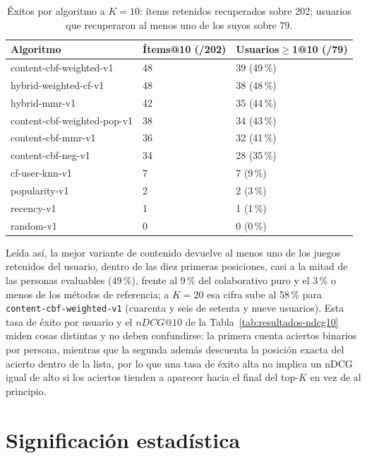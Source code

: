 \begin{table}[H]
\centering
\caption{Éxitos por algoritmo a \(K=10\): ítems retenidos recuperados sobre 202; usuarios
que recuperaron al menos uno de los suyos sobre 79.}\label{tab:exito-usuarios}
\small
\begin{tabularx}{\textwidth}{@{}>{\ttfamily\raggedright\arraybackslash}X C{0.22\textwidth} C{0.25\textwidth}@{}}
\textnormal{Algoritmo} & \textnormal{Ítems@10 (/202)} & \textnormal{Usuarios\(\geq\)1@10 (/79)} \\
\hline
content-cbf-weighted-v1 & 48 & 39 (49\,\%) \\
hybrid-weighted-cf-v1 & 48 & 38 (48\,\%) \\
hybrid-mmr-v1 & 42 & 35 (44\,\%) \\
content-cbf-weighted-pop-v1 & 38 & 34 (43\,\%) \\
content-cbf-mmr-v1 & 36 & 32 (41\,\%) \\
content-cbf-neg-v1 & 34 & 28 (35\,\%) \\
cf-user-knn-v1 & 7 & 7 (9\,\%) \\
popularity-v1 & 2 & 2 (3\,\%) \\
recency-v1 & 1 & 1 (1\,\%) \\
random-v1 & 0 & 0 (0\,\%) \\
\end{tabularx}
\end{table}

Leída así, la mejor variante de contenido devuelve al menos uno de los juegos retenidos del
usuario, dentro de las diez primeras posiciones, casi a la mitad de las personas evaluables
(49\,\%), frente al 9\,\% del colaborativo puro y el 3\,\% o menos de los métodos de referencia; a
\(K=20\) esa cifra sube al 58\,\% para \texttt{content-cbf-weighted-v1} (cuarenta y seis de
setenta y nueve usuarios). Esta tasa de éxito por usuario y el \(nDCG@10\) de la
Tabla~\ref{tab:resultados-ndcg10} miden cosas distintas y no deben confundirse: la primera
cuenta aciertos binarios por persona, mientras que la segunda además descuenta la posición
exacta del acierto dentro de la lista, por lo que una tasa de éxito alta no implica un nDCG
igual de alto si los aciertos tienden a aparecer hacia el final del top-\(K\) en vez de al
principio.

\section{Significación estadística}\label{sec:exp-significacion}

